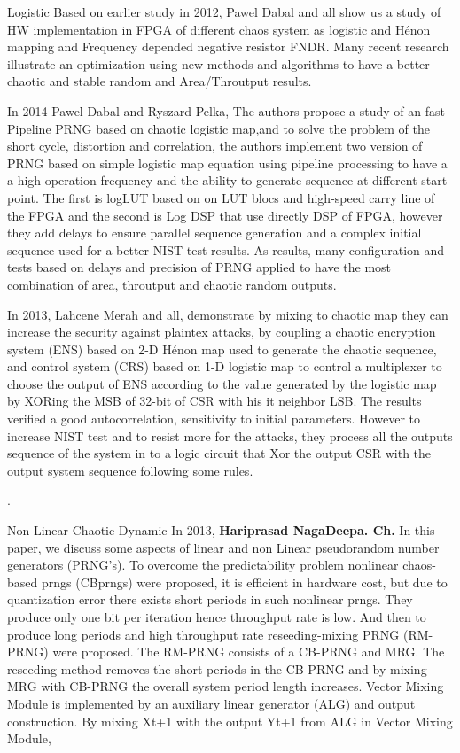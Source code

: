 Logistic
Based on earlier study in 2012, Pawel Dabal and all show us a study of HW implementation in FPGA of different chaos system as logistic and Hénon mapping and Frequency depended negative resistor FNDR. Many recent research illustrate an optimization using new methods and algorithms to have a better chaotic and stable random and Area/Throutput results.

In 2014 Pawel Dabal and Ryszard Pelka, The authors propose a study of an fast Pipeline PRNG based on chaotic logistic map,and to solve the problem of the short cycle, distortion and correlation, the authors implement two version of PRNG based on simple logistic map equation using pipeline processing to have a a high operation frequency and the ability to generate sequence at different start point. The first is logLUT based on on LUT blocs and high-speed carry line of the FPGA and the second is Log DSP that use directly DSP of FPGA, however they add delays to ensure parallel sequence generation and a complex initial sequence used for a better NIST test results. As results, many configuration and tests based on delays and precision of PRNG applied to have the most combination of area, throutput and chaotic random outputs. 

In 2013, Lahcene Merah and all, demonstrate by mixing to chaotic map they can increase the security against plaintex attacks, by coupling a chaotic encryption system (ENS) based on 2-D Hénon map used to generate the chaotic sequence, and control system (CRS) based on 1-D logistic map to control a multiplexer to choose the output of ENS according to the value generated by the logistic map by XORing the MSB of 32-bit of CSR with his it neighbor LSB. The results verified a good autocorrelation, sensitivity to initial parameters. However to increase NIST test and to resist more for the attacks, they process all the outputs sequence of the system in to a logic circuit that Xor the output CSR with the output system sequence following some rules.

. 


Non-Linear Chaotic Dynamic
In 2013, \textbf{Hariprasad  NagaDeepa. Ch.  }In this paper, we discuss some aspects of linear and non Linear pseudorandom number generators (PRNG's). To overcome the predictability problem nonlinear chaos-based prngs (CBprngs) were proposed, it is efficient in hardware cost, but due to quantization error there exists short periods in such nonlinear prngs. They produce only one bit per iteration hence throughput rate is low. And then to produce long periods and high throughput rate reseeding-mixing PRNG (RM-PRNG) were proposed. The RM-PRNG consists of a CB-PRNG and MRG. The reseeding method removes the short periods in the CB-PRNG and by mixing MRG with CB-PRNG the overall system period length increases. Vector Mixing Module is implemented by an auxiliary linear generator (ALG) and output construction. By mixing Xt+1 with the output Yt+1 from ALG in Vector Mixing Module,

